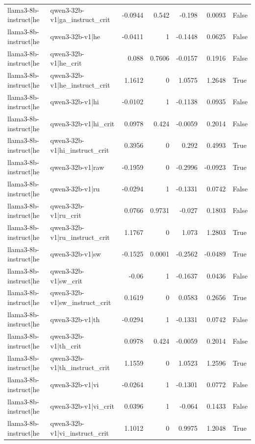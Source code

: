 \begin{table}
\begin{tabular}{l l r r r r l}
llama3-8b-instruct|he & qwen3-32b-v1|ga_instruct_crit & -0.0944 & 0.542 & -0.198 & 0.0093 & False \\
llama3-8b-instruct|he & qwen3-32b-v1|he & -0.0411 & 1 & -0.1448 & 0.0625 & False \\
llama3-8b-instruct|he & qwen3-32b-v1|he_crit & 0.088 & 0.7606 & -0.0157 & 0.1916 & False \\
llama3-8b-instruct|he & qwen3-32b-v1|he_instruct_crit & 1.1612 & 0 & 1.0575 & 1.2648 & True \\
llama3-8b-instruct|he & qwen3-32b-v1|hi & -0.0102 & 1 & -0.1138 & 0.0935 & False \\
llama3-8b-instruct|he & qwen3-32b-v1|hi_crit & 0.0978 & 0.424 & -0.0059 & 0.2014 & False \\
llama3-8b-instruct|he & qwen3-32b-v1|hi_instruct_crit & 0.3956 & 0 & 0.292 & 0.4993 & True \\
llama3-8b-instruct|he & qwen3-32b-v1|raw & -0.1959 & 0 & -0.2996 & -0.0923 & True \\
llama3-8b-instruct|he & qwen3-32b-v1|ru & -0.0294 & 1 & -0.1331 & 0.0742 & False \\
llama3-8b-instruct|he & qwen3-32b-v1|ru_crit & 0.0766 & 0.9731 & -0.027 & 0.1803 & False \\
llama3-8b-instruct|he & qwen3-32b-v1|ru_instruct_crit & 1.1767 & 0 & 1.073 & 1.2803 & True \\
llama3-8b-instruct|he & qwen3-32b-v1|sw & -0.1525 & 0.0001 & -0.2562 & -0.0489 & True \\
llama3-8b-instruct|he & qwen3-32b-v1|sw_crit & -0.06 & 1 & -0.1637 & 0.0436 & False \\
llama3-8b-instruct|he & qwen3-32b-v1|sw_instruct_crit & 0.1619 & 0 & 0.0583 & 0.2656 & True \\
llama3-8b-instruct|he & qwen3-32b-v1|th & -0.0294 & 1 & -0.1331 & 0.0742 & False \\
llama3-8b-instruct|he & qwen3-32b-v1|th_crit & 0.0978 & 0.424 & -0.0059 & 0.2014 & False \\
llama3-8b-instruct|he & qwen3-32b-v1|th_instruct_crit & 1.1559 & 0 & 1.0523 & 1.2596 & True \\
llama3-8b-instruct|he & qwen3-32b-v1|vi & -0.0264 & 1 & -0.1301 & 0.0772 & False \\
llama3-8b-instruct|he & qwen3-32b-v1|vi_crit & 0.0396 & 1 & -0.064 & 0.1433 & False \\
llama3-8b-instruct|he & qwen3-32b-v1|vi_instruct_crit & 1.1012 & 0 & 0.9975 & 1.2048 & True \\

\end{tabular}
\end{table}
